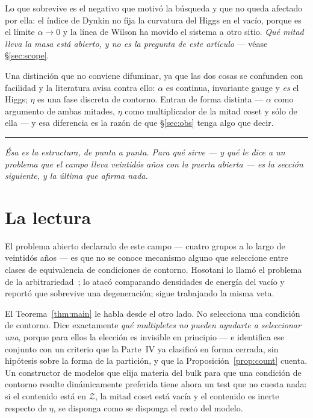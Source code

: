 \documentclass[11pt,a4paper]{article}
\newcommand{\bridge}[1]{\par\medskip\noindent
  \textcolor{hdrblue!45}{\rule{2.2cm}{0.6pt}}\;\;\parbox[t]{0.84\textwidth}{\small\itshape
  \textcolor{hdrblue!85}{#1}}\par\medskip}
\begin{document}
\noindent Lo que sobrevive es el negativo que motivó la búsqueda y que no queda afectado por ella: el
índice de Dynkin no fija la curvatura del Higgs en el vacío, porque es el límite $\alpha\to0$ y la
línea de Wilson ha movido el sistema a otro sitio. \emph{Qué mitad lleva la masa está abierto, y no
es la pregunta de este artículo} --- véase \S\ref{sec:scope}.

\medskip
Una distinción que no conviene difuminar, ya que las dos cosas se confunden con facilidad y la
literatura avisa contra ello: $\alpha$ es continua, invariante gauge y \emph{es} el Higgs; $\eta$ es
una fase discreta de contorno. Entran de forma distinta --- $\alpha$ como argumento de ambas mitades,
$\eta$ como multiplicador de la mitad coset y sólo de ella --- y esa diferencia es la razón de que
\S\ref{sec:obs} tenga algo que decir.

\bridge{Ésa es la estructura, de punta a punta. Para \emph{qué} sirve --- y qué le dice a un problema
que el campo lleva veintidós años con la puerta abierta --- es la sección siguiente, y la última que
afirma nada.}

\section{La lectura}\label{sec:reading}

El problema abierto declarado de este campo --- cuatro grupos a lo largo de veintidós años --- es que
no se conoce mecanismo alguno que seleccione entre clases de equivalencia de condiciones de contorno.
Hosotani lo llamó el problema de la arbitrariedad~\cite{HosotaniArb}; \cite{HHK} lo atacó comparando
densidades de energía del vacío y reportó que sobrevive una degeneración; \cite{KKKY} sigue trabajando
la misma veta.

El Teorema~\ref{thm:main} le habla desde el otro lado. No selecciona una condición de contorno. Dice
exactamente \emph{qué multipletes no pueden ayudarte a seleccionar una}, porque para ellos la
elección es invisible en principio --- e identifica ese conjunto con un criterio que la Parte~IV ya
clasificó en forma cerrada, sin hipótesis sobre la forma de la partición, y que la
Proposición~\ref{prop:count} cuenta. Un constructor de modelos que elija materia del bulk para que
una condición de contorno resulte dinámicamente preferida tiene ahora un test que no cuesta nada: si
el contenido está en $\mathcal Z$, la mitad coset está vacía y el contenido es inerte respecto de
$\eta$, se disponga como se disponga el resto del modelo.
\end{document}
